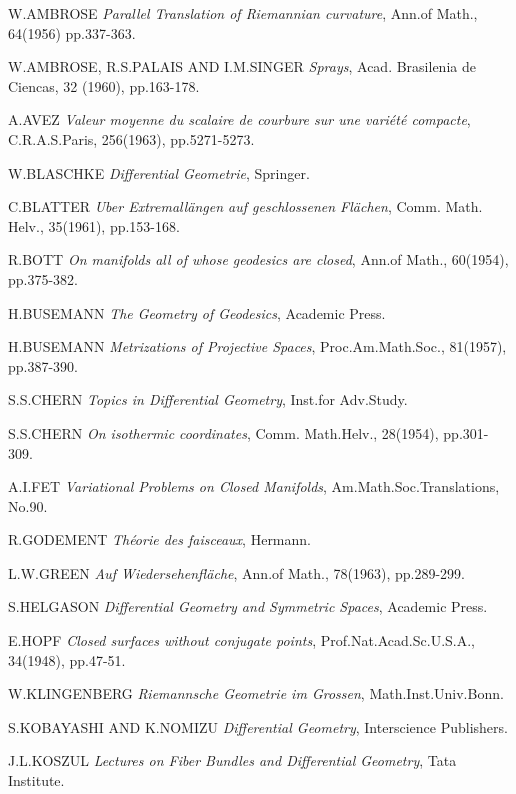 \begin{thebibliography}{99}
 W.\@ AMBROSE {\em Parallel Translation of Riemannian
  curvature}, Ann.\@ of Math., 64(1956) pp.337-363.

 W.\@ AMBROSE, R.S.\@ PALAIS AND I.M.\@ SINGER {\em
  Sprays}, Acad. Brasilenia de Ciencas, 32 (1960), pp.\@ 163-178.

 A.\@ AVEZ {\em Valeur moyenne du scalaire de courbure sur
  une vari\'et\'e compacte}, C.R.A.S.\@ Paris, 256(1963),
  pp.5271-5273.

 W.\@ BLASCHKE {\em Differential Geometrie}, Springer.

 C.\@ BLATTER {\em Uber Extremall\"angen auf geschlossenen
  Fl\"achen}, Comm. Math. Helv., 35(1961), pp.153-168.

 R.\@ BOTT {\em On manifolds all of whose geodesics are
  closed}, Ann.\@ of Math., 60(1954), pp.375-382. 

 H.\@ BUSEMANN {\em The Geometry of Geodesics}, Academic Press.

 H.\@ BUSEMANN {\em Metrizations of Projective Spaces},
  Proc.\@ Am.\@ Math.\@ Soc., 81(1957), pp.387-390.

 S.S.\@ CHERN {\em Topics in Differential Geometry},
  Inst.\@ for Adv.\@ Study. 

 S.S.\@ CHERN {\em On isothermic coordinates}, Comm.\@
  Math.\@ Helv., 28(1954), pp.301-309.

 A.I.\@ FET {\em Variational Problems on Closed
  Manifolds}, Am.\@ Math.\@ Soc.\@ Translations, No.\@ 90.

 R.\@ GODEMENT {\em Th\'eorie des faisceaux}, Hermann.

 L.W.\@ GREEN {\em Auf Wiedersehenfl\"ache}, Ann.\@ of
  Math., 78(1963), pp.289-299. 

 S.\@ HELGASON {\em Differential Geometry and Symmetric
  Spaces}, Academic Press.

 E.\@ HOPF {\em Closed surfaces without conjugate points},
  Prof.\@ Nat.\@ Acad.\@ Sc.\@ U.S.A., 34(1948), pp.47-51.

 W.\@ KLINGENBERG {\em Riemannsche Geometrie im Grossen},
  Math.\@ Inst.\@ Univ.\@ Bonn.

 S.\@ KOBAYASHI AND K.\@ NOMIZU {\em Differential
  Geometry}, Interscience Publishers.

 J.L.\@ KOSZUL {\em Lectures on Fiber Bundles and
  Differential Geometry}, Tata Institute.


\end{thebibliography}
